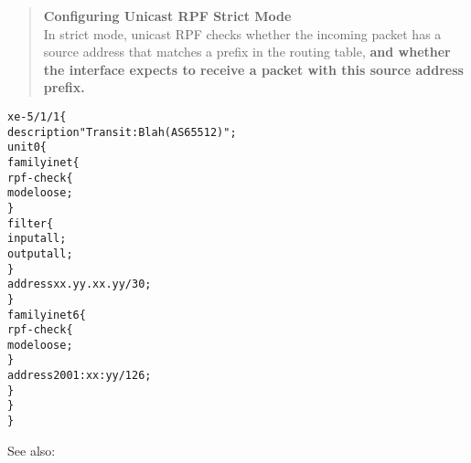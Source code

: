 \documentclass[20pt,landscape,a4paper,footrule]{foils}
\begin{document}






\begin{quote}
{\bf Configuring Unicast RPF Strict Mode}\\
In strict mode, unicast RPF checks whether the incoming packet has a source address that matches a prefix in the routing table, {\bf and whether the interface expects to receive a packet with this source address prefix.}
\end{quote}



\begin{alltt}\footnotesize
xe-5/1/1 \{
    description "Transit: Blah (AS65512)";
    unit 0 \{
        family inet \{
            rpf-check \{
                mode loose;
            \}
            filter \{
                input all;
                output all;
            \}
            address xx.yy.xx.yy/30;
        \}
        family inet6 \{
            rpf-check \{
                mode loose;
            \}
            address 2001:xx:yy/126;
        \}
    \}
\}
\end{alltt}

See also: {\small{}}
\end{document}
